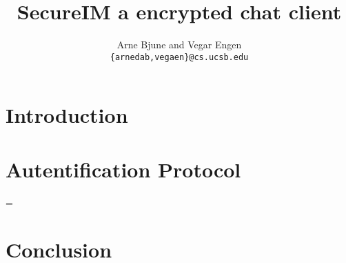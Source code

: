 \documentclass[twocolumn,11pt]{IEEEtran}
\begin{document}
\title{SecureIM a encrypted chat client}


\author{Arne Bjune and Vegar Engen \\ \texttt{\{arnedab,vegaen\}@cs.ucsb.edu}}


\maketitle

\begin{abstract}

\end{abstract}

\section {Introduction}
\label{sec:introduction}

\section{Autentification Protocol}
\label{sec:auth}

=

\section {Conclusion}
\label{sec:conclusion}








\end{document}

